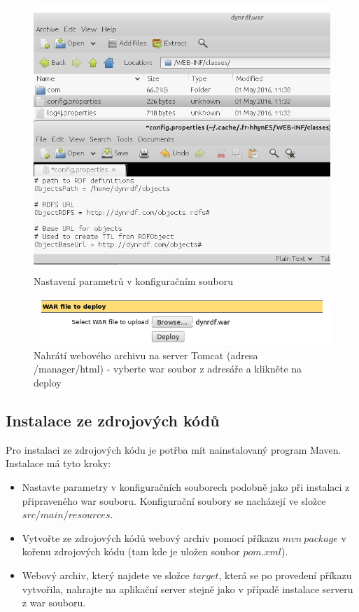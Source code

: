 \documentclass[thesis=B,czech]{FITthesis}[2012/06/26]
\begin{document}
      \begin{figure}\centering
 	\includegraphics[width=\textwidth]{config}
 	\caption[Nastavení parametrů v konfiguračním souboru]{Nastavení parametrů v konfiguračním souboru}\label{config}		
  \end{figure}
  
        \begin{figure}\centering
 	\includegraphics[width=\textwidth]{tomcat_deploy}
 	\caption[Nahrátí webového archivu na server Tomcat]{Nahrátí webového archivu na server Tomcat (adresa /manager/html) - vyberte war soubor z adresáře a klikněte na deploy}\label{tomcat_deploy}		
  \end{figure}
  

  
  \subsection{Instalace ze zdrojových kódů}
  Pro instalaci ze zdrojových kódu je potřba mít nainstalovaný program Maven.
  Instalace má tyto kroky:
   \begin{itemize}
   \item Nastavte parametry v konfiguračních souborech podobně jako při instalaci z připraveného war souboru. Konfigurační soubory se
   nacházejí ve složce $src/main/resources$.
   \item Vytvořte ze zdrojových kódů webový archiv pomocí příkazu $mvn \ package$ v kořenu zdrojových kódu (tam kde je uložen soubor $pom.xml$).
   \item Webový archiv, který najdete ve složce $target$, která se po provedení příkazu vytvořila, nahrajte na aplikační server stejně jako 
   v případě instalace serveru z war souboru.
  \end{itemize}
\end{document}
